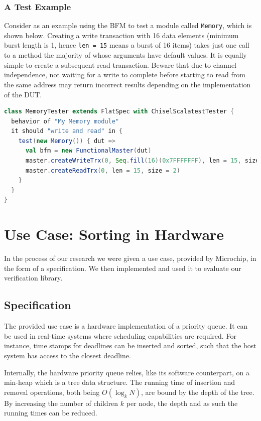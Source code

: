 \documentclass[conference]{IEEEtran}
\begin{document}
\subsubsection{A Test Example}
Consider as an example using the BFM to test a module called \texttt{Memory}, which is shown below. Creating a write transaction with 16 data elements (minimum burst length is 1, hence \texttt{len = 15} means a burst of 16 items) takes just one call to a method the majority of whose arguments have default values. It is equally simple to create a subsequent read transaction. Beware that due to channel independence, not waiting for a write to complete before starting to read from the same address may return incorrect results depending on the implementation of the DUT.
\begin{lstlisting}[language=scala, caption={Using the AXI4 BFM with ChiselTest}, label={lst:axitest}]
class MemoryTester extends FlatSpec with ChiselScalatestTester {
  behavior of "My Memory module"
  it should "write and read" in {
    test(new Memory()) { dut =>
      val bfm = new FunctionalMaster(dut)
      master.createWriteTrx(0, Seq.fill(16)(0x7FFFFFFF), len = 15, size = 2)
      master.createReadTrx(0, len = 15, size = 2)
    }
  }
}
\end{lstlisting}

\section{Use Case: Sorting in Hardware}

In the process of our research we were given a use case, provided by Microchip, in the form of a specification.
We then implemented and used it to evaluate our verification library.

\subsection{Specification}

The provided use case is a hardware implementation of a priority queue. It can be used in real-time systems where scheduling capabilities are required. For instance, time stamps for deadlines can be inserted and sorted, such that the host system has access to the closest deadline.

Internally, the hardware priority queue relies, like its software counterpart, on a min-heap which is a tree data structure. The running time of insertion and removal operations, both being $O(\log_k N)$, are bound by the depth of the tree. By increasing the number of children $k$ per node, the depth and as such the running times can be reduced.
\end{document}
